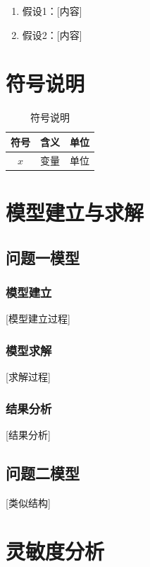 \documentclass[12pt,a4paper]{article}
\begin{document}
\begin{enumerate}
    \item 假设1：[内容]
    \item 假设2：[内容]
\end{enumerate}

\section{符号说明}

\begin{table}[H]
\centering
\caption{符号说明}
\begin{tabular}{cll}
\toprule
\textbf{符号} & \textbf{含义} & \textbf{单位} \\
\midrule
$x$ & 变量 & 单位 \\
\bottomrule
\end{tabular}
\end{table}

\section{模型建立与求解}

\subsection{问题一模型}

\subsubsection{模型建立}
[模型建立过程]

\subsubsection{模型求解}
[求解过程]

\subsubsection{结果分析}
[结果分析]

\subsection{问题二模型}
[类似结构]

\section{灵敏度分析}
\end{document}
